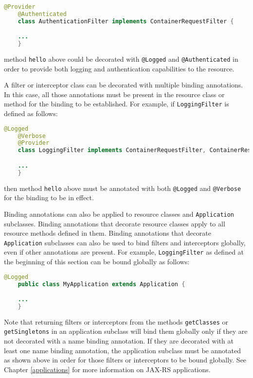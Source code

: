 \begin{lstlisting}[language=Java]
    @Provider
    @Authenticated
    class AuthenticationFilter implements ContainerRequestFilter {

    ...
    }
\end{lstlisting}

method \lstinline{hello} above could be decorated with \lstinline{@Logged} and \lstinline{@Authenticated} in order to
provide both logging and authentication capabilities to the resource.

A filter or interceptor class can be decorated with multiple binding annotations. In this case, all those annotations
must be present in the resource class or method for the binding to be established. For example, if
\lstinline{LoggingFilter} is defined as follows:

\begin{lstlisting}[language=Java]
    @Logged
    @Verbose
    @Provider
    class LoggingFilter implements ContainerRequestFilter, ContainerResponseFilter {

    ...
    }
\end{lstlisting}

then method \lstinline{hello} above must be annotated with both \lstinline{@Logged} and \lstinline{@Verbose} for the
binding to be in effect.

Binding annotations can also be applied to resource classes and \lstinline{Application} subclasses. Binding annotations
that decorate resource classes apply to all resource methods defined in them. Binding annotations that decorate
\lstinline{Application} subclasses can also be used to bind filters and interceptors globally, even if other annotations
are present. For example, \lstinline{LoggingFilter} as defined at the beginning of this section can be bound globally as
follows:

\begin{lstlisting}[language=Java]
    @Logged
    public class MyApplication extends Application {

    ...
    }
\end{lstlisting}

Note that returning filters or interceptors from the methods \lstinline{getClasses} or \lstinline{getSingletons} in an
application subclass will bind them globally only if they are not decorated with a name binding annotation. If they are
decorated with at least one name binding annotation, the application subclass must be annotated as shown above in order
for those filters or interceptors to be bound globally. See Chapter \ref{applications} for more information on JAX-RS
applications.

